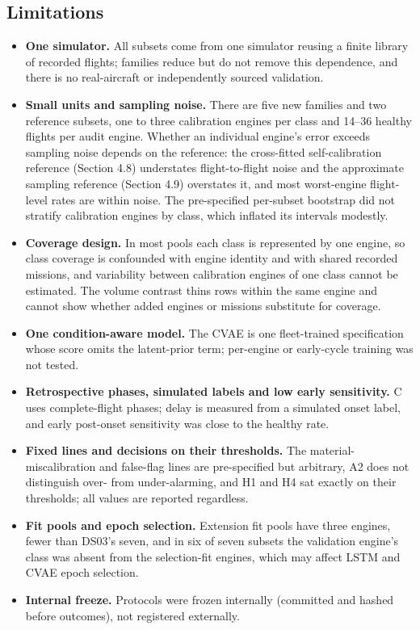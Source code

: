 \documentclass[preprint,11pt,a4paper]{elsarticle}
\begin{document}
\subsection{Limitations}
\begin{itemize}
\item \textbf{One simulator.} All subsets come from one simulator reusing a finite library of recorded flights; families reduce but do not remove this dependence, and there is no real-aircraft or independently sourced validation.
\item \textbf{Small units and sampling noise.} There are five new families and two reference subsets, one to three calibration engines per class and 14–36 healthy flights per audit engine. Whether an individual engine's error exceeds sampling noise depends on the reference: the cross-fitted self-calibration reference (Section 4.8) understates flight-to-flight noise and the approximate sampling reference (Section 4.9) overstates it, and most worst-engine flight-level rates are within noise. The pre-specified per-subset bootstrap did not stratify calibration engines by class, which inflated its intervals modestly.
\item \textbf{Coverage design.} In most pools each class is represented by one engine, so class coverage is confounded with engine identity and with shared recorded missions, and variability between calibration engines of one class cannot be estimated. The volume contrast thins rows within the same engine and cannot show whether added engines or missions substitute for coverage.
\item \textbf{One condition-aware model.} The CVAE is one fleet-trained specification whose score omits the latent-prior term; per-engine or early-cycle training \cite{N38} was not tested.
\item \textbf{Retrospective phases, simulated labels and low early sensitivity.} C uses complete-flight phases; delay is measured from a simulated onset label, and early post-onset sensitivity was close to the healthy rate.
\item \textbf{Fixed lines and decisions on their thresholds.} The material-miscalibration and false-flag lines are pre-specified but arbitrary, A2 does not distinguish over- from under-alarming, and H1 and H4 sat exactly on their thresholds; all values are reported regardless.
\item \textbf{Fit pools and epoch selection.} Extension fit pools have three engines, fewer than DS03's seven, and in six of seven subsets the validation engine's class was absent from the selection-fit engines, which may affect LSTM and CVAE epoch selection.
\item \textbf{Internal freeze.} Protocols were frozen internally (committed and hashed before outcomes), not registered externally.
\end{itemize}
\end{document}
